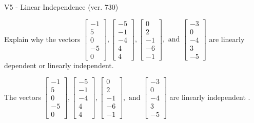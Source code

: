\begin{exercise}
  \begin{exerciseTitle}V5 - Linear Independence (ver. 730)\end{exerciseTitle}
  \begin{exerciseStatement}
    Explain why the vectors \(\left[\begin{array}{r}
-1 \\
5 \\
0 \\
-5 \\
0
\end{array}\right] , \left[\begin{array}{r}
-5 \\
-1 \\
-4 \\
4 \\
4
\end{array}\right] , \left[\begin{array}{r}
0 \\
2 \\
-1 \\
-6 \\
-1
\end{array}\right] , \text{ and } \left[\begin{array}{r}
-3 \\
0 \\
-4 \\
3 \\
-5
\end{array}\right]\) are linearly dependent or linearly independent.	


  \end{exerciseStatement}
  \begin{exerciseAnswer}
   The vectors \(\left[\begin{array}{r}
-1 \\
5 \\
0 \\
-5 \\
0
\end{array}\right] , \left[\begin{array}{r}
-5 \\
-1 \\
-4 \\
4 \\
4
\end{array}\right] , \left[\begin{array}{r}
0 \\
2 \\
-1 \\
-6 \\
-1
\end{array}\right] , \text{ and } \left[\begin{array}{r}
-3 \\
0 \\
-4 \\
3 \\
-5
\end{array}\right]\) are 
  	 linearly independent  .
  


  \end{exerciseAnswer}
\end{exercise}